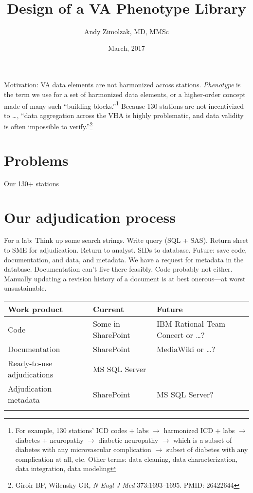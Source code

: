 \documentclass{tufte-handout}
\title{Design of a VA Phenotype Library}
\author{Andy Zimolzak, MD, MMSc}
\date{March, 2017}
\begin{document}
\maketitle

Motivation: VA data elements are not harmonized across stations.
\emph{Phenotype} is the term we use for a set of harmonized data
elements, or a higher-order concept made of many such ``building
blocks.''\footnote{For example, 130 stations' ICD codes + labs $\to$
  harmonized ICD + labs $\to$ diabetes + neuropathy $\to$ diabetic
  neuropathy $\to$ which is a subset of diabetes with any
  microvascular complication $\to$ subset of diabetes with any
  complication at all, etc. Other terms: data cleaning, data
  characterization, data integration, data modeling} Because 130
stations are not incentivized to \ldots{}, %
``data aggregation across the
VHA is highly problematic, and data validity is often impossible to
verify.''\footnote{Giroir BP, Wilensky GR, \emph{N Engl J Med}
  373:1693--1695. PMID: 26422644}

\section{Problems}

Our 130+ stations %

\section{Our adjudication process}

For a lab: Think up some search strings. Write query (SQL + SAS). Return
sheet to SME for adjudication. Return to analyst. SIDs to database.
Future: save code, documentation, and data, and metadata. We have a
request for metadata in the database. Documentation can't live there
feasibly. Code probably not either. Manually updating a revision
history of a document is at best onerous---at worst unsustainable.

\noindent \begin{tabular}{lll}
\\
\hline
Work product & Current & Future\\
\hline
Code & Some in SharePoint & IBM Rational Team Concert or \ldots{}?\\
Documentation & SharePoint & MediaWiki or \ldots{}?\\
Ready-to-use adjudications & MS SQL Server\\
Adjudication metadata & SharePoint & MS SQL Server?\\
\hline
\\
\end{tabular}
\end{document}
